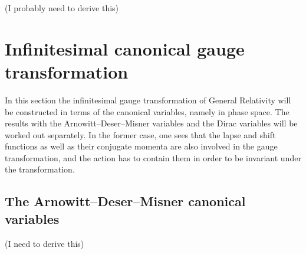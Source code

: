\documentclass[a4paper,11pt]{article}
\begin{document}
(I probably need to derive this)

\section{Infinitesimal canonical gauge transformation}
\label{sec:can-gauge-trsf}

In this section the infinitesimal gauge transformation of General Relativity 
will be constructed in terms of the canonical variables, namely in phase 
space. The results with the Arnowitt--Deser--Misner variables and the Dirac 
variables will be worked out separately. In the former case, one sees that the 
lapse and shift functions as well as their conjugate momenta are also involved 
in the gauge transformation, and the action has to contain them in order to be 
invariant under the transformation.

\subsection{The Arnowitt--Deser--Misner canonical variables}


(I need to derive this)
\end{document}
